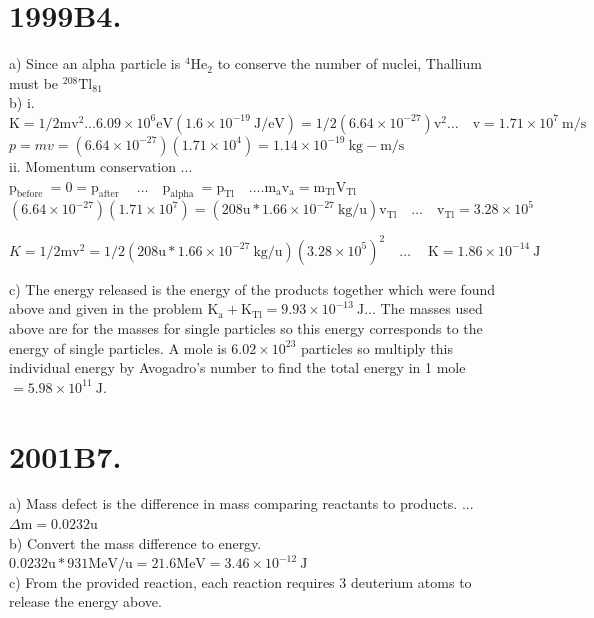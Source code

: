 \begin{enumerate}
\section*{1999B4.}
a) Since an alpha particle is ${ }^{4} \mathrm{He}_{2}$ to conserve the number of nuclei, Thallium must be ${ }^{208} \mathrm{Tl}_{81}$\\
b) i. $\mathrm{K}=1 / 2 \mathrm{mv}^{2} \ldots 6.09 \times 10^{6} \mathrm{eV}\left(1.6 \times 10^{-19} \mathrm{~J} / \mathrm{eV}\right)=1 / 2\left(6.64 \times 10^{-27}\right) \mathrm{v}^{2} \ldots \quad \mathrm{v}=1.71 \times 10^{7} \mathrm{~m} / \mathrm{s}$\\
$p=m v=\left(6.64 \times 10^{-27}\right)\left(1.71 \times 10^{4}\right)=1.14 \times 10^{-19} \mathrm{~kg}-\mathrm{m} / \mathrm{s}$\\
ii. Momentum conservation ... $\mathrm{p}_{\text {before }}=0=\mathrm{p}_{\text {after }} \quad \ldots \quad \mathrm{p}_{\text {alpha }}=\mathrm{p}_{\mathrm{Tl}} \quad \ldots . \mathrm{m}_{\mathrm{a}} \mathrm{v}_{\mathrm{a}}=\mathrm{m}_{\mathrm{Tl}} \mathrm{V}_{\mathrm{Tl}}$ $\left(6.64 \times 10^{-27}\right)\left(1.71 \times 10^{7}\right)=\left(208 \mathrm{u} * 1.66 \times 10^{-27} \mathrm{~kg} / \mathrm{u}\right) \mathrm{v}_{\mathrm{Tl}} \quad \ldots \quad \mathrm{v}_{\mathrm{Tl}}=3.28 \times 10^{5}$

$$
K=1 / 2 \mathrm{mv}^{2}=1 / 2\left(208 \mathrm{u} * 1.66 \times 10^{-27} \mathrm{~kg} / \mathrm{u}\right)\left(3.28 \times 10^{5}\right)^{2} \quad \ldots \quad \mathrm{~K}=1.86 \times 10^{-14} \mathrm{~J}
$$

c) The energy released is the energy of the products together which were found above and given in the problem $\mathrm{K}_{\mathrm{a}}+\mathrm{K}_{\mathrm{Tl}}=9.93 \times 10^{-13} \mathrm{~J} \ldots$ The masses used above are for the masses for single particles so this energy corresponds to the energy of single particles. A mole is $6.02 \times 10^{23}$ particles so multiply this individual energy by Avogadro's number to find the total energy in 1 mole $=5.98 \times 10^{11} \mathrm{~J}$.

\section*{2001B7.}
a) Mass defect is the difference in mass comparing reactants to products. ... $\Delta \mathrm{m}=0.0232 \mathrm{u}$\\
b) Convert the mass difference to energy. $0.0232 \mathrm{u} * 931 \mathrm{MeV} / \mathrm{u}=21.6 \mathrm{MeV}=3.46 \times 10^{-12} \mathrm{~J}$\\
c) From the provided reaction, each reaction requires 3 deuterium atoms to release the energy above.


\end{enumerate}
